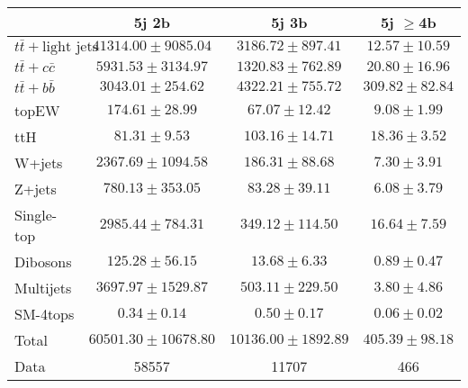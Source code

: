 \begin{table}
\begin{center}
  \begin{tabular}{ | l |  c |  c |  c | }
    \hline \hline 
     & 5j 2b  & 5j 3b  & 5j $\geq$4b  \\ 
    \hline 
     $t\bar{t}+\text{light jets}$  &   $ 41314.00 \pm 9085.04 $ &   $ 3186.72 \pm 897.41 $ &   $ 12.57 \pm 10.59 $ \\ 
     $t\bar{t}+c\bar{c}$  &   $ 5931.53 \pm 3134.97 $ &   $ 1320.83 \pm 762.89 $ &   $ 20.80 \pm 16.96 $ \\ 
     $t\bar{t}+b\bar{b}$  &   $ 3043.01 \pm 254.62 $ &   $ 4322.21 \pm 755.72 $ &   $ 309.82 \pm 82.84 $ \\ 
    topEW  &   $ 174.61 \pm 28.99 $ &   $ 67.07 \pm 12.42 $ &   $ 9.08 \pm 1.99 $ \\ 
    ttH  &   $ 81.31 \pm 9.53 $ &   $ 103.16 \pm 14.71 $ &   $ 18.36 \pm 3.52 $ \\ 
    W+jets  &   $ 2367.69 \pm 1094.58 $ &   $ 186.31 \pm 88.68 $ &   $ 7.30 \pm 3.91 $ \\ 
    Z+jets  &   $ 780.13 \pm 353.05 $ &   $ 83.28 \pm 39.11 $ &   $ 6.08 \pm 3.79 $ \\ 
    Single-top  &   $ 2985.44 \pm 784.31 $ &   $ 349.12 \pm 114.50 $ &   $ 16.64 \pm 7.59 $ \\ 
    Dibosons  &   $ 125.28 \pm 56.15 $ &   $ 13.68 \pm 6.33 $ &   $ 0.89 \pm 0.47 $ \\ 
    Multijets  &   $ 3697.97 \pm 1529.87 $ &   $ 503.11 \pm 229.50 $ &   $ 3.80 \pm 4.86 $ \\ 
    SM-4tops  &   $ 0.34 \pm 0.14 $ &   $ 0.50 \pm 0.17 $ &   $ 0.06 \pm 0.02 $ \\ 
    Total  &   $ 60501.30 \pm 10678.80 $ &   $ 10136.00 \pm 1892.89 $ &   $ 405.39 \pm 98.18 $ \\ 
    \hline 
    Data  & 58557  & 11707  & 466  \\ 
    \hline \hline 
  \end{tabular} 



\end{center}
\end{table}

